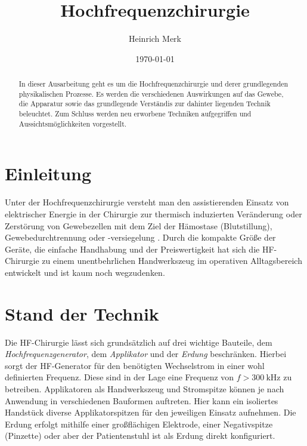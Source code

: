 \documentclass[letterpaper,12pt]{article}
\begin{document}
	
	\title{Hochfrequenzchirurgie}
	\author{Heinrich Merk}
	\date{\today}
	\maketitle
	
	\begin{abstract}
		In dieser Ausarbeitung geht es um die Hochfrequenzchirurgie und derer grundlegenden physikalischen Prozesse. Es werden die verschiedenen Auswirkungen auf das Gewebe, die Apparatur sowie das grundlegende Verständis zur dahinter liegenden Technik beleuchtet. Zum Schluss werden neu erworbene Techniken aufgegriffen und Aussichtsmöglichkeiten vorgestellt.
		
	\end{abstract}
	
	\section{Einleitung}
	
		Unter der Hochfrequenzchirurgie versteht man den assistierenden Einsatz von elektrischer Energie in der Chirurgie zur thermisch induzierten Veränderung oder Zerstörung von Gewebezellen mit dem Ziel der Hämostase (Blutstillung), Gewebedurchtrennung oder -versiegelung \cite{kramme2016medizintechnik}. Durch die kompakte Größe der Geräte, die einfache Handhabung und der Preiswertigkeit hat sich die HF-Chirurgie zu einem unentbehrlichen Handwerkszeug im operativen Alltagsbereich entwickelt und ist kaum noch wegzudenken.
	
	\section{Stand der Technik}
	
		Die HF-Chirurgie lässt sich grundsätzlich auf drei wichtige Bauteile, dem \emph{Hochfrequenzgenerator}, dem \emph{Applikator} und der \emph{Erdung} beschränken. Hierbei sorgt der HF-Generator für den benötigten Wechselstrom in einer wohl definierten Frequenz. Diese sind in der Lage eine Frequenz von $f>\SI{300}{\kilo\hertz}$ zu betreiben. Applikatoren als Handwerkszeug und Stromspitze können je nach Anwendung in verschiedenen Bauformen auftreten. Hier kann ein isoliertes Handstück diverse Applikatorspitzen für den jeweiligen Einsatz aufnehmen. Die Erdung erfolgt mithilfe einer großflächigen Elektrode, einer Negativspitze (Pinzette) oder aber der Patientenstuhl ist als Erdung direkt konfiguriert. 
		
\end{document}
